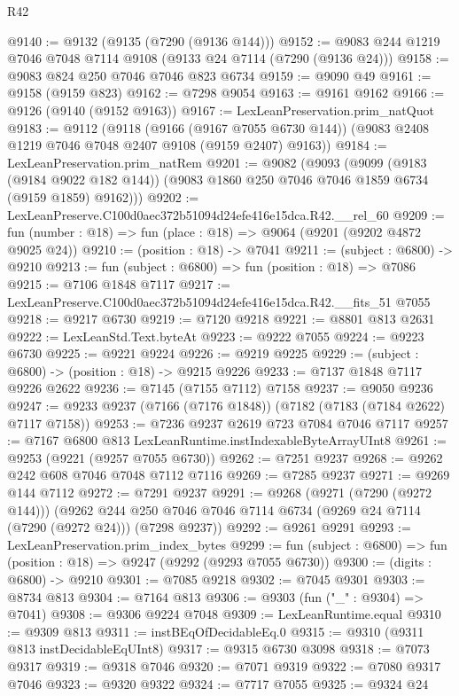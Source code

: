 \begin{lexlean}{R42}
\begin{coremodule}
{@9140 := @9132 (@9135 (@7290 (@9136 @144)))
@9152 := @9083 @244 @1219 @7046 @7048 @7114 @9108 (@9133 @24 @7114 (@7290 (@9136 @24)))
@9158 := @9083 @824 @250 @7046 @7046 @823 @6734
@9159 := @9090 @49
@9161 := @9158 (@9159 @823)
@9162 := @7298 @9054
@9163 := @9161 @9162
@9166 := @9126 (@9140 (@9152 @9163))
@9167 := LexLeanPreservation.prim_natQuot
@9183 := @9112
    (@9118
      (@9166 (@9167 @7055 @6730 @144))
      (@9083 @2408 @1219 @7046 @7048 @2407 @9108 (@9159 @2407) @9163))
@9184 := LexLeanPreservation.prim_natRem
@9201 := @9082
    (@9093
      (@9099
        (@9183 (@9184 @9022 @182 @144))
        (@9083 @1860 @250 @7046 @7046 @1859 @6734 (@9159 @1859) @9162)))
@9202 := LexLeanPreserve.C100d0aec372b51094d24efe416e15dca.R42.__rel_60
@9209 := fun (number : @18) => fun (place : @18) => @9064 (@9201 (@9202 @4872 @9025 @24))
@9210 := (position : @18) -> @7041
@9211 := (subject : @6800) -> @9210
@9213 := fun (subject : @6800) => fun (position : @18) => @7086
@9215 := @7106 @1848 @7117
@9217 := LexLeanPreserve.C100d0aec372b51094d24efe416e15dca.R42.__fits_51 @7055
@9218 := @9217 @6730
@9219 := @7120 @9218
@9221 := @8801 @813 @2631
@9222 := LexLeanStd.Text.byteAt
@9223 := @9222 @7055
@9224 := @9223 @6730
@9225 := @9221 @9224
@9226 := @9219 @9225
@9229 := (subject : @6800) -> (position : @18) -> @9215 @9226
@9233 := @7137 @1848 @7117 @9226 @2622
@9236 := @7145 (@7155 @7112) @7158
@9237 := @9050 @9236
@9247 := @9233 @9237 (@7166 (@7176 @1848)) (@7182 (@7183 (@7184 @2622) @7117 @7158))
@9253 := @7236 @9237 @2619 @723 @7084 @7046 @7117
@9257 := @7167 @6800 @813 LexLeanRuntime.instIndexableByteArrayUInt8
@9261 := @9253 (@9221 (@9257 @7055 @6730))
@9262 := @7251 @9237
@9268 := @9262 @242 @608 @7046 @7048 @7112 @7116
@9269 := @7285 @9237
@9271 := @9269 @144 @7112
@9272 := @7291 @9237
@9291 := @9268
    (@9271 (@7290 (@9272 @144)))
    (@9262 @244 @250 @7046 @7046 @7114 @6734 (@9269 @24 @7114 (@7290 (@9272 @24))) (@7298 @9237))
@9292 := @9261 @9291
@9293 := LexLeanPreservation.prim_index_bytes
@9299 := fun (subject : @6800) => fun (position : @18) => @9247 (@9292 (@9293 @7055 @6730))
@9300 := (digits : @6800) -> @9210
@9301 := @7085 @9218
@9302 := @7045 @9301
@9303 := @8734 @813
@9304 := @7164 @813
@9306 := @9303 (fun ("_" : @9304) => @7041)
@9308 := @9306 @9224 @7048
@9309 := LexLeanRuntime.equal
@9310 := @9309 @813
@9311 := instBEqOfDecidableEq.{0}
@9315 := @9310 (@9311 @813 instDecidableEqUInt8)
@9317 := @9315 @6730 @3098
@9318 := @7073 @9317
@9319 := @9318 @7046
@9320 := @7071 @9319
@9322 := @7080 @9317 @7046
@9323 := @9320 @9322
@9324 := @7717 @7055
@9325 := @9324 @24
}
\end{coremodule}
\end{lexlean}
